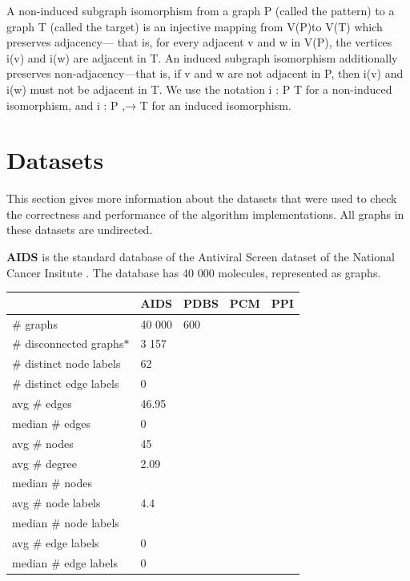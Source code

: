 \documentclass{l4proj}
\theoremstyle{definition}
\begin{document}
A non-induced subgraph isomorphism from a graph P
(called the pattern) to a graph T (called the target) is an injective
mapping from V(P)to V(T) which preserves adjacency—
that is, for every adjacent v and w in V(P), the vertices i(v)
and i(w) are adjacent in T. An induced subgraph isomorphism
additionally preserves non-adjacency—that is, if v and
w are not adjacent in P, then i(v) and i(w) must not be adjacent
in T. We use the notation i : P  T for a non-induced
isomorphism, and i : P ,→ T for an induced isomorphism.

\section{Datasets}
\label{sec:datasets}
This section gives more information about the datasets that were used to check the correctness and performance of the algorithm implementations. All graphs in these datasets are undirected.\par
\textbf{AIDS} is the standard database of the Antiviral Screen dataset of the National Cancer Insitute \cite{datasets}. The database has 40 000 molecules, represented as graphs. 

\begin{center}
\begin{tabular}{ |l|l|l|l|l| } 
 \hline
   & AIDS & PDBS & PCM  & PPI \\
 \hline
 \# graphs & 40 000 & 600 &   &  \\ 
 \hline
 \# disconnected graphs$*$ & 3 157 &  &   &  \\ 
 \hline
 \# distinct node labels & 62 &  &   &  \\ 
 \hline
  \# distinct edge labels & 0 &  &   &  \\ 
 \hline
 avg \# edges & 46.95 &  &   &  \\ 
 \hline
 median \# edges & 0 &  &   &  \\ 
 \hline
 avg \# nodes & 45 &  &   &  \\ 
 \hline
  avg \# degree & 2.09 &  &   &  \\ 
 \hline
 median \# nodes &  &  &   &  \\ 
 \hline
 avg \# node labels & 4.4 &  &   &  \\ 
 \hline
 median \# node labels &  &  &   &  \\ 
 \hline
 avg \# edge labels & 0 &  &   &  \\ 
 \hline
 median \# edge labels & 0 &  &   &  \\ 
 \hline
\end{tabular}
\end{center}
\end{document}
